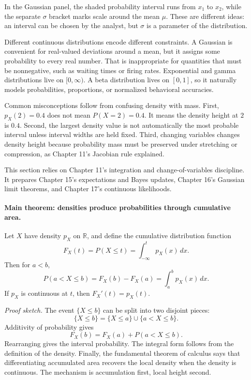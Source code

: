 In the Gaussian panel, the shaded probability interval runs from \(x_1\) to \(x_2\), while the separate \(\sigma\) bracket marks scale around the mean \(\mu\). These are different ideas: an interval can be chosen by the analyst, but \(\sigma\) is a parameter of the distribution.

Different continuous distributions encode different constraints. A Gaussian is convenient for real-valued deviations around a mean, but it assigns some probability to every real number. That is inappropriate for quantities that must be nonnegative, such as waiting times or firing rates. Exponential and gamma distributions live on \([0,\infty)\). A beta distribution lives on \([0,1]\), so it naturally models probabilities, proportions, or normalized behavioral accuracies.

Common misconceptions follow from confusing density with mass. First, \(p_X(2)=0.4\) does not mean \(P(X=2)=0.4\). It means the density height at \(2\) is \(0.4\). Second, the largest density value is not automatically the most probable interval unless interval widths are held fixed. Third, changing variables changes density height because probability mass must be preserved under stretching or compression, as Chapter 11's Jacobian rule explained.

This section relies on Chapter 11's integration and change-of-variables discipline. It prepares Chapter 15's expectations and Bayes updates, Chapter 16's Gaussian limit theorems, and Chapter 17's continuous likelihoods.

\paragraph{Main theorem: densities produce probabilities through cumulative area.}
Let \(X\) have density \(p_X\) on \(\mathbb R\), and define the cumulative distribution function
\[
F_X(t)=P(X\leq t)=\int_{-\infty}^t p_X(x)\,dx.
\]
Then for \(a<b\),
\[
\boxed{P(a<X\leq b)=F_X(b)-F_X(a)=\int_a^b p_X(x)\,dx.}
\]
If \(p_X\) is continuous at \(t\), then \(F_X'(t)=p_X(t)\).

\emph{Proof sketch.}
The event \(\{X\leq b\}\) can be split into two disjoint pieces:
\[
\{X\leq b\}=\{X\leq a\}\cup\{a<X\leq b\}.
\]
Additivity of probability gives
\[
F_X(b)=F_X(a)+P(a<X\leq b).
\]
Rearranging gives the interval probability. The integral form follows from the definition of the density. Finally, the fundamental theorem of calculus says that differentiating accumulated area recovers the local density when the density is continuous. The mechanism is accumulation first, local height second.

